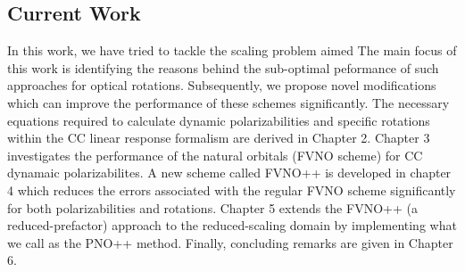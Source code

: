 \subsection{Current Work}
In this work, we have tried to tackle the scaling problem aimed
The main focus of this work is identifying the 
reasons behind the sub-optimal peformance of such approaches for optical rotations. Subsequently, we propose novel modifications
which can improve the performance of these schemes significantly.
The necessary equations required to calculate dynamic polarizabilities and specific rotations within the CC linear response formalism are derived in Chapter 2. %
Chapter 3 investigates the performance of the natural orbitals (FVNO scheme) for CC dynamaic polarizabilites.
A new scheme called FVNO++ is developed in chapter 4 which reduces the errors associated with the regular FVNO scheme
significantly for both polarizabilities and rotations. Chapter 5 extends the FVNO++ (a reduced-prefactor) approach to the reduced-scaling 
domain by implementing what we call as the PNO++ method. Finally, concluding remarks are given in Chapter 6.
